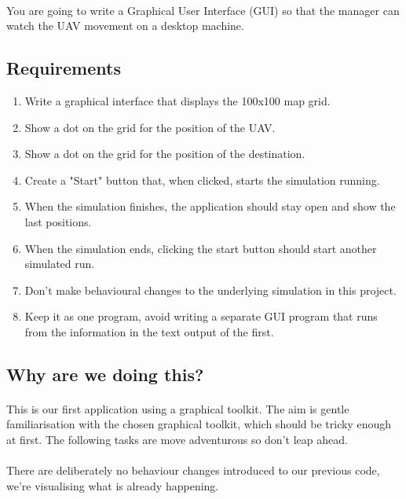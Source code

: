 \documentclass[11pt]{book}
\begin{document}
\paragraph{} You are going to write a Graphical User Interface (GUI) so that
the manager can watch the UAV movement on a desktop machine.

\subsection{Requirements}

\begin{enumerate}
\item Write a graphical interface that displays the 100x100 map grid.
\item Show a dot on the grid for the position of the UAV.
\item Show a dot on the grid for the position of the destination.
\item Create a "Start" button that, when clicked, starts the simulation running.
\item When the simulation finishes, the application should stay open and show the last positions.
\item When the simulation ends, clicking the start button should start another simulated run.
\item Don't make behavioural changes to the underlying simulation in this project.
\item Keep it as one program, avoid writing a separate GUI program that runs from the information in the text output of the first.
\end{enumerate}

\subsection{Why are we doing this?}

\paragraph{} This is our first application using a graphical toolkit. The aim
is gentle familiarisation with the chosen graphical toolkit, which should be
tricky enough at first. The following tasks are move adventurous so don't leap
ahead.

\paragraph{} There are deliberately no behaviour changes introduced to our
previous code, we're visualising what is already happening.
\end{document}
